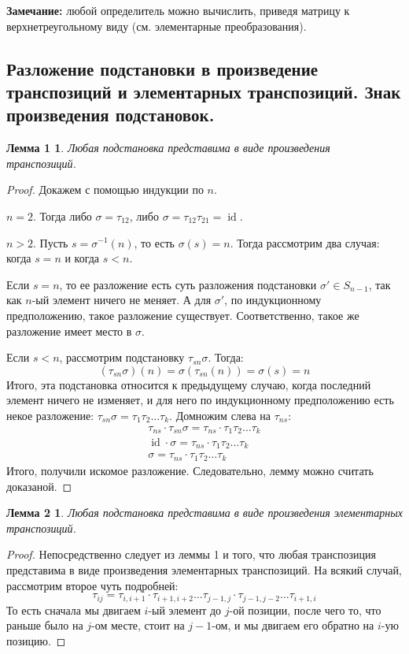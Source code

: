 \documentclass[a4paper, 12pt]{article}
\DeclareMathOperator{\id}{id}
\newtheorem*{que22lemma1}{Лемма 1}
\newtheorem*{que22lemma2}{Лемма 2}
\begin{document}
\textbf{Замечание:} любой определитель можно вычислить, приведя матрицу к верхнетреугольному виду (см. элементарные преобразования).

\subsection{Разложение подстановки в произведение транспозиций и элементарных транспозиций. Знак произведения подстановок.}
\begin{que22lemma1}
Любая подстановка представима в виде произведения транспозиций.
\end{que22lemma1}

\begin{proof}
Докажем с помощью индукции по $n$.

$n=2$. Тогда либо $\sigma = \tau_{12}$, либо $\sigma = \tau_{12}\tau_{21} = \id$.

$n >  2$. Пусть $s = \sigma^{-1}(n)$, то есть $\sigma(s) = n$. Тогда рассмотрим два случая: когда $s = n$ и когда $s <  n$.

Если $s = n$, то ее разложение есть суть разложения подстановки $\sigma' \in S_{n-1}$, так как $n$-ый элемент ничего не меняет. А для $\sigma'$, по индукционному предположению, такое разложение существует. Соответственно, такое же разложение имеет место в $\sigma$.

Если $s < n$, рассмотрим подстановку $\tau_{sn}\sigma$. Тогда:
$$
(\tau_{sn}\sigma)(n) = \sigma(\tau_{sn}(n)) = \sigma(s) = n
$$
Итого, эта подстановка относится к предыдущему случаю, когда последний элемент ничего не изменяет, и для него по индукционному предположению есть некое разложение: $\tau_{sn}\sigma = \tau_1\tau_2\dots\tau_k
$. Домножим слева на $\tau_{ns}$:
\begin{gather*}
\tau_{ns} \cdot \tau_{sn}\sigma = \tau_{ns} \cdot \tau_1\tau_2\dots\tau_k \\
\id \cdot \sigma = \tau_{ns} \cdot \tau_1\tau_2\dots\tau_k \\
\sigma = \tau_{ns} \cdot \tau_1\tau_2\dots\tau_k
\end{gather*}
Итого, получили искомое разложение. Следовательно, лемму можно считать доказаной.
\end{proof}

\begin{que22lemma2}
Любая подстановка представима в виде произведения элементарных транспозиций.
\end{que22lemma2}
\begin{proof}
Непосредственно следует из леммы 1 и того, что любая транспозиция представима в виде произведения элементарных транспозиций. На всякий случай, рассмотрим второе чуть подробней:
$$
\tau_{ij} = \tau_{i, i+1} \cdot  \tau_{i+1, i+2} \dots \tau_{j-1, j} \cdot \tau_{j-1, j-2} \dots \tau_{i+1, i}
$$
То есть сначала мы двигаем $i$-ый элемент до $j$-ой позиции, после чего то, что раньше было на $j$-ом месте, стоит на $j-1$-ом, и мы двигаем его обратно на $i$-ую позицию. 
\end{proof}
\end{document}
